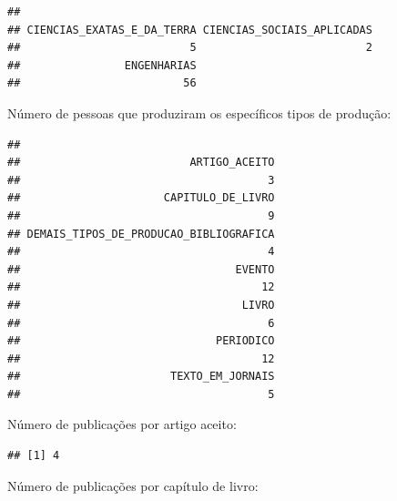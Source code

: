 \documentclass[]{article}
\newenvironment{Shaded}{\begin{snugshade}}{\end{snugshade}}
\newcommand{\ControlFlowTok}[1]{\textcolor[rgb]{0.13,0.29,0.53}{\textbf{#1}}}
\newcommand{\KeywordTok}[1]{\textcolor[rgb]{0.13,0.29,0.53}{\textbf{#1}}}
\newcommand{\NormalTok}[1]{#1}
\newcommand{\OperatorTok}[1]{\textcolor[rgb]{0.81,0.36,0.00}{\textbf{#1}}}
\begin{document}
\begin{verbatim}
## 
## CIENCIAS_EXATAS_E_DA_TERRA CIENCIAS_SOCIAIS_APLICADAS 
##                          5                          2 
##                ENGENHARIAS 
##                         56
\end{verbatim}

Número de pessoas que produziram os específicos tipos de produção:

\begin{Shaded}
\end{Shaded}

\begin{verbatim}
## 
##                          ARTIGO_ACEITO 
##                                      3 
##                      CAPITULO_DE_LIVRO 
##                                      9 
## DEMAIS_TIPOS_DE_PRODUCAO_BIBLIOGRAFICA 
##                                      4 
##                                 EVENTO 
##                                     12 
##                                  LIVRO 
##                                      6 
##                              PERIODICO 
##                                     12 
##                       TEXTO_EM_JORNAIS 
##                                      5
\end{verbatim}

Número de publicações por artigo aceito:

\begin{Shaded}
\end{Shaded}

\begin{verbatim}
## [1] 4
\end{verbatim}

Número de publicações por capítulo de livro:

\begin{Shaded}
\end{Shaded}
\end{document}
